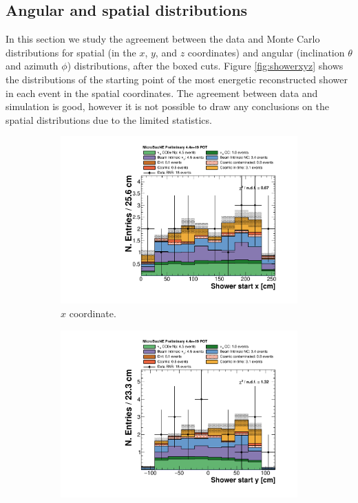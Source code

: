 \subsection{Angular and spatial distributions}
In this section we study the agreement between the data and Monte Carlo distributions for spatial (in the $x$, $y$, and $z$ coordinates) and angular (inclination $\theta$ and azimuth $\phi$) distributions, after the boxed cuts.
Figure \ref{fig:showerxyz} shows the distributions of the starting point of the most energetic reconstructed shower in each event in the spatial coordinates. The agreement between data and simulation is good, however it is not possible to draw any conclusions on the spatial distributions due to the limited statistics. 

\begin{figure}[htbp]
\centering
  \begin{subfigure}{0.3\textwidth}
    \includegraphics[width=\linewidth]{figures/h_shower_start_x.pdf}
    \caption{$x$ coordinate.} 
  \end{subfigure}
  \begin{subfigure}{0.3\textwidth}
    \includegraphics[width=\linewidth]{figures/h_shower_start_y.pdf}

\end{subfigure}
\end{figure}
